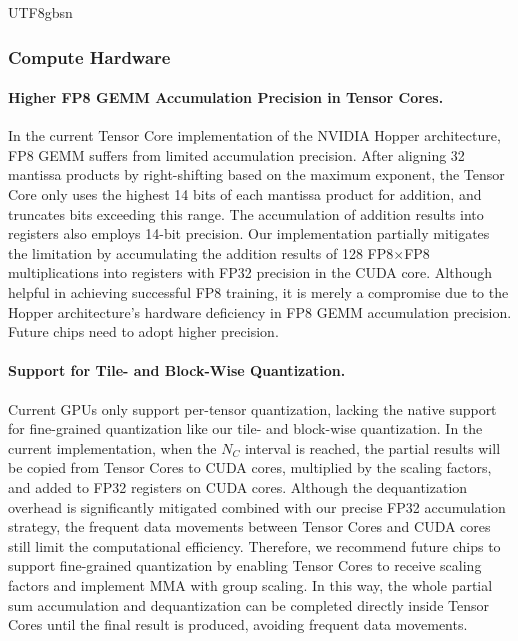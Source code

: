 \documentclass[11pt, a4paper, logo, copyright, nonumbering]{deepseek}
\begin{document}
\begin{CJK*}{UTF8}{gbsn}
\subsubsection{Compute Hardware}

\paragraph{Higher FP8 GEMM Accumulation Precision in Tensor Cores.}
In the current Tensor Core implementation of the NVIDIA Hopper architecture, FP8 GEMM suffers from limited accumulation precision. After aligning 32 mantissa products by right-shifting based on the maximum exponent, the Tensor Core only uses the highest 14 bits of each mantissa product for addition, and truncates bits exceeding this range. The accumulation of addition results into registers also employs 14-bit precision. Our implementation partially mitigates the limitation by accumulating the addition results of 128 FP8$\times$FP8 multiplications into registers with FP32 precision in the CUDA core. 
Although helpful in achieving successful FP8 training, it is merely a compromise due to the Hopper architecture's hardware deficiency in FP8 GEMM accumulation precision.
Future chips need to adopt higher precision.

\paragraph{Support for Tile- and Block-Wise Quantization.}
Current GPUs only support per-tensor quantization, lacking the native support for fine-grained quantization like our tile- and block-wise quantization.
In the current implementation, when the $N_C$ interval is reached, the partial results will be copied from Tensor Cores to CUDA cores, multiplied by the scaling factors, and added to FP32 registers on CUDA cores.
Although the dequantization overhead is significantly mitigated combined with our precise FP32 accumulation strategy, the frequent data movements between Tensor Cores and CUDA cores still limit the computational efficiency. 
Therefore, we recommend future chips to support fine-grained quantization by enabling Tensor Cores to receive scaling factors and implement MMA with group scaling. 
In this way, the whole partial sum accumulation and dequantization can be completed directly inside Tensor Cores until the final result is produced, avoiding frequent data movements.


\end{CJK*}
\end{document}
